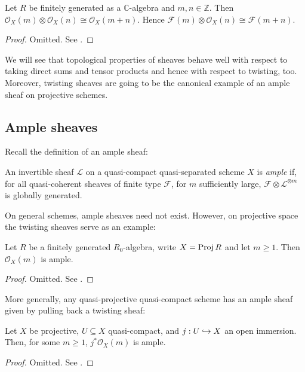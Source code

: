 \documentclass[12pt]{ociamthesis}  %
\begin{document}
\begin{lemma}\label{lem:additivity_twisting_sheaf}
  Let $R$ be finitely generated as a $\mathbb C$-algebra and $m,n\in\mathbb{Z}$.
  Then $\mathscr O_X(m) \otimes \mathscr O_X(n) \cong \mathscr O_X(m + n)$. Hence
  $\mathscr F(m) \otimes \mathscr O_X(n) \cong \mathscr F(m+n)$.
  \begin{proof}
    Omitted. See \cite[378]{gortz2010}.
  \end{proof}
\end{lemma}

We will see that topological properties of sheaves behave well
with respect to taking direct sums and tensor products and hence
with respect to twisting, too. Moreover, twisting sheaves are going
to be the canonical example of an ample sheaf on projective schemes.

\subsection{Ample sheaves}

Recall the definition of an ample sheaf:

\begin{definition}
  An invertible sheaf $\mathscr L$ on a quasi-compact quasi-separated
  scheme $X$ is \emph{ample} if, for all quasi-coherent sheaves of
  finite type $\mathscr F$, for $m$ sufficiently large,
  $\mathscr F\otimes \mathscr L^{\otimes m}$ is
  globally generated.
\end{definition}

On general schemes, ample sheaves need not exist. However, on
projective space the twisting sheaves serve as an example:

\begin{proposition}
  Let $R$ be a finitely generated $R_0$-algebra,
  write $X=\operatorname{Proj} R$ and let $m\geq 1$. Then
  $\mathscr O_X(m)$ is ample.
  \begin{proof}
    Omitted. See \cite[Example 13.45]{gortz2010}.
  \end{proof}
\end{proposition}

More generally, any quasi-projective quasi-compact scheme has
an ample sheaf given by pulling back a twisting sheaf:

\begin{proposition}
  Let $X$ be projective, $U\subseteq X$ quasi-compact, and
  $j : U \hookrightarrow X$ an open immersion. Then, for some $m\geq 1$,
  $j^*\mathscr O_X(m)$ is ample.
  \begin{proof}
    Omitted. See \cite[\href{https://stacks.math.columbia.edu/tag/01Q2}{Tag 01Q2}]{stacks-project}.
  \end{proof}
\end{proposition}
\end{document}
